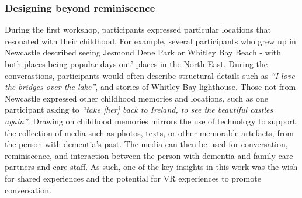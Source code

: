 
\subsubsection{Designing beyond reminiscence}
\label{ReminiscencevsMoment}
During the first workshop, participants expressed particular locations that resonated with their childhood. For example, several participants who grew up in Newcastle described seeing Jesmond Dene Park or Whitley Bay Beach - with both places being popular days out' places in the North East. During the converastions, participants would often describe structural details such as \textit{``I love the bridges over the lake''}, and stories of Whitley Bay lighthouse. Those not from Newcastle expressed other childhood memories and locations, such as one participant asking to \textit{``take [her] back to Ireland, to see the beautiful castles again''}. Drawing on childhood memories mirrors the use of technology to support the collection of media such as photos, texts, or other memorable artefacts, from the person with dementia's past. The media can then be used for conversation, reminiscence, and interaction between the person with dementia and family care partners and care staff. As such, one of the key insights in this work was the wish for shared experiences and the potential for VR experiences to promote conversation. 

